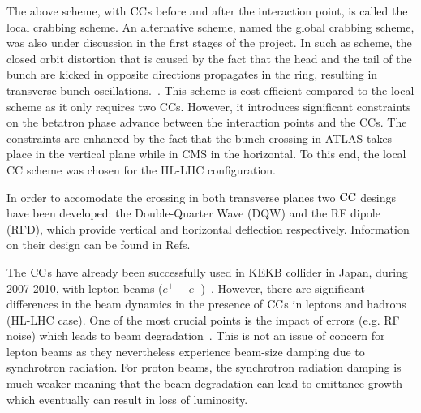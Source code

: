 The above scheme, with ${\mathrm{CC}}$s before and after the interaction point, is called the local crabbing scheme. An alternative scheme, named the global crabbing scheme, was also under discussion in the first stages of the project. In such as scheme, the closed orbit distortion that is caused by the fact that the head and the tail of the bunch are kicked in opposite directions propagates in the ring, resulting in transverse bunch oscillations.~\cite{Brning2015}. This scheme is cost-efficient compared to the local scheme as it only requires two CCs. However, it introduces significant constraints on the betatron phase advance between the interaction points and the CCs. The constraints are enhanced by the fact that the bunch crossing in ATLAS takes place in the vertical plane while in CMS in the horizontal. To this end, the local CC scheme was chosen for the HL-LHC configuration. %

In order to accomodate the crossing in both transverse planes two ${\mathrm{CC}}$ desings have been developed: the Double-Quarter Wave (DQW) and the RF dipole (RFD), which provide vertical and horizontal deflection respectively. Information on their design can be found in Refs.~\cite{Zanoni:2288282, DeSilva:2288607, Xiao:1992565, Verdú-Andrés:2113440}

The ${\mathrm{CC}}$s have already been successfully used in KEKB collider in Japan, during 2007-2010, with lepton beams ($e^{+} - e^{-}$)~\cite{CC_KEKB_4440798, Funakoshi:1955812, oide:pac07-mozaki01}. However, there are significant differences in the beam dynamics in the presence of ${\mathrm{CC}}$s in leptons and hadrons (HL-LHC case). One of the most crucial points is the impact of errors (e.g. RF noise) which leads to beam degradation~\cite{Calaga:2773279, Alekou:2696109}. This is not an issue of concern for lepton beams as they nevertheless experience beam-size damping due to synchrotron radiation. For proton beams, the synchrotron radiation damping is much weaker meaning that the beam degradation can lead to emittance growth which eventually can result in loss of luminosity.


